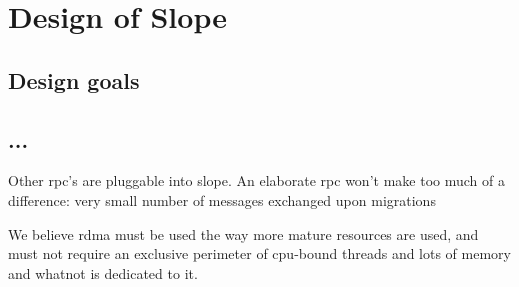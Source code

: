 \chapter{Design of Slope}
\label{chap:design}

\section{Design goals}
\section{...}

Other rpc's are pluggable into slope.
An elaborate rpc won't make too much of a difference: very small number of messages exchanged upon migrations

We believe rdma must be used the way more mature resources are used, and must not require an exclusive perimeter of cpu-bound threads and lots of memory and whatnot is dedicated to it.


